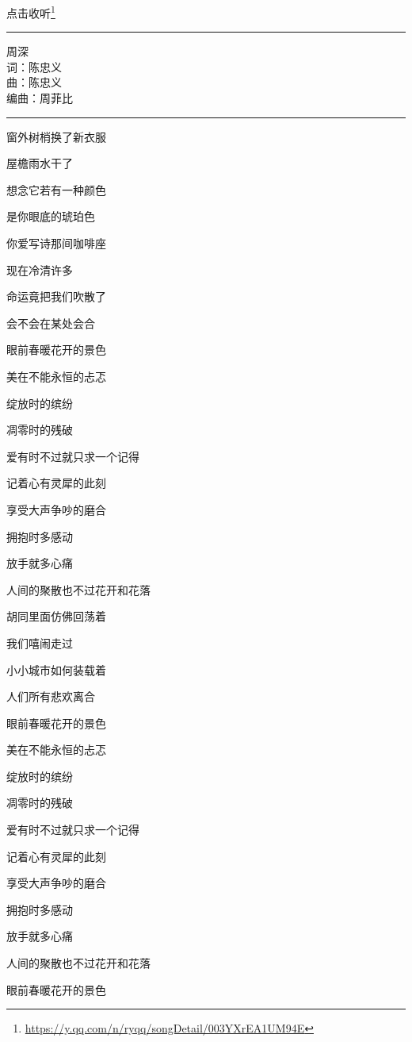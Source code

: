 \documentclass[]{ctexbook}
\renewcommand{\href}[2]{#2\footnote{\url{#1}}}
\begin{document}
\href{https://y.qq.com/n/ryqq/songDetail/003YXrEA1UM94E}{点击收听}

\begin{center}\rule{0.5\linewidth}{0.5pt}\end{center}

周深\\
词：陈忠义\\
曲：陈忠义\\
编曲：周菲比

\begin{center}\rule{0.5\linewidth}{0.5pt}\end{center}

窗外树梢换了新衣服

屋檐雨水干了

想念它若有一种颜色

是你眼底的琥珀色

你爱写诗那间咖啡座

现在冷清许多

命运竟把我们吹散了

会不会在某处会合

眼前春暖花开的景色

美在不能永恒的忐忑

绽放时的缤纷

凋零时的残破

爱有时不过就只求一个记得

记着心有灵犀的此刻

享受大声争吵的磨合

拥抱时多感动

放手就多心痛

人间的聚散也不过花开和花落

胡同里面仿佛回荡着

我们嘻闹走过

小小城市如何装载着

人们所有悲欢离合

眼前春暖花开的景色

美在不能永恒的忐忑

绽放时的缤纷

凋零时的残破

爱有时不过就只求一个记得

记着心有灵犀的此刻

享受大声争吵的磨合

拥抱时多感动

放手就多心痛

人间的聚散也不过花开和花落

眼前春暖花开的景色
\end{document}
